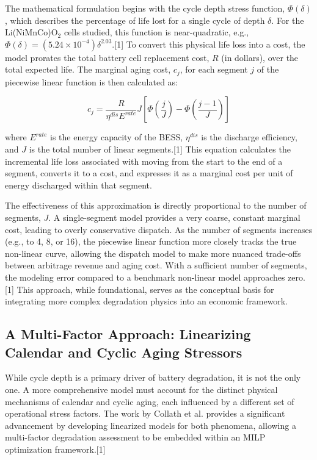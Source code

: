 The mathematical formulation begins with the cycle depth stress function, $\Phi(\delta)$, which describes the percentage of life lost for a single cycle of depth $\delta$. For the Li(NiMnCo)O$_2$ cells studied, this function is near-quadratic, e.g., $\Phi(\delta)=(5.24 \times 10^{-4})\delta^{2.03}$.[1] To convert this physical life loss into a cost, the model prorates the total battery cell replacement cost, $R$ (in dollars), over the total expected life. The marginal aging cost, $c_j$, for each segment $j$ of the piecewise linear function is then calculated as:

\begin{equation}
c_{j}=\frac{R}{\eta^{dis}E^{rate}}J[\Phi(\frac{j}{J})-\Phi(\frac{j-1}{J})]
\end{equation}

where $E^{rate}$ is the energy capacity of the BESS, $\eta^{dis}$ is the discharge efficiency, and $J$ is the total number of linear segments.[1] This equation calculates the incremental life loss associated with moving from the start to the end of a segment, converts it to a cost, and expresses it as a marginal cost per unit of energy discharged within that segment.

The effectiveness of this approximation is directly proportional to the number of segments, $J$. A single-segment model provides a very coarse, constant marginal cost, leading to overly conservative dispatch. As the number of segments increases (e.g., to 4, 8, or 16), the piecewise linear function more closely tracks the true non-linear curve, allowing the dispatch model to make more nuanced trade-offs between arbitrage revenue and aging cost. With a sufficient number of segments, the modeling error compared to a benchmark non-linear model approaches zero.[1] This approach, while foundational, serves as the conceptual basis for integrating more complex degradation physics into an economic framework.

\subsection{A Multi-Factor Approach: Linearizing Calendar and Cyclic Aging Stressors}

While cycle depth is a primary driver of battery degradation, it is not the only one. A more comprehensive model must account for the distinct physical mechanisms of calendar and cyclic aging, each influenced by a different set of operational stress factors. The work by Collath et al. provides a significant advancement by developing linearized models for both phenomena, allowing a multi-factor degradation assessment to be embedded within an MILP optimization framework.[1]

